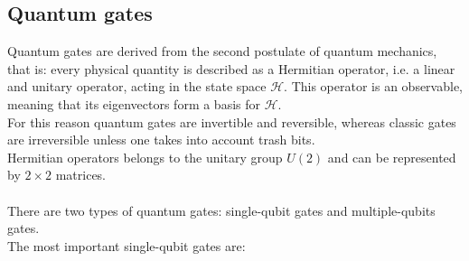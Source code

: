 \subsection{Quantum gates}
Quantum gates are derived from the second postulate of quantum mechanics, that is: every physical quantity is described as a Hermitian operator, i.e. a linear and unitary operator, acting in the state space $\mathcal{H}$. This operator is an observable, meaning that its eigenvectors form a basis for $\mathcal{H}$. \\
For this reason quantum gates are invertible and reversible, whereas classic gates are irreversible unless one takes into account trash bits. \\
Hermitian operators belongs to the unitary group $U(2)$ and can be represented by $2 \times 2$ matrices. \\
\\
There are two types of quantum gates: single-qubit gates and multiple-qubits gates. \\
The most important single-qubit gates are:
